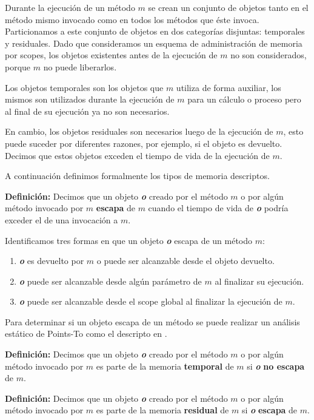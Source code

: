 \documentclass[12pt,a4paper]{article}
\begin{document}
			Durante la ejecución de un método $m$ se crean un conjunto de objetos tanto en el método mismo invocado como en todos los métodos que éste invoca. Particionamos a este conjunto de objetos en dos categorías disjuntas: temporales y residuales. Dado que consideramos un esquema de administración de memoria por scopes, los objetos existentes antes de la ejecución de $m$ no son considerados, porque $m$ no puede liberarlos.

			Los objetos temporales son los objetos que $m$ utiliza de forma auxiliar, los mismos son utilizados durante la ejecución de $m$ para un cálculo o proceso pero al final de su ejecución ya no son necesarios.

			En cambio, los objetos residuales son necesarios luego de la ejecución de $m$, esto puede suceder por diferentes razones, por ejemplo, si el objeto es devuelto. Decimos que estos objetos exceden el tiempo de vida de la ejecución de $m$.

			A continuación definimos formalmente los tipos de memoria descriptos.

			\textbf{Definición:} Decimos que un objeto \textit{\textbf{o}} creado por el método $m$ o por algún método invocado por $m$ \textbf{escapa} de $m$ cuando el tiempo de vida de \textit{\textbf{o}} podría exceder el de una invocación a $m$.

			Identificamos tres formas en que un objeto \textit{\textbf{o}} escapa de un método $m$:
			\begin{enumerate}
				\item \textit{\textbf{o}} es devuelto por $m$ o puede ser alcanzable desde el objeto devuelto.
				\item \textit{\textbf{o}} puede ser alcanzable desde algún parámetro de $m$ al finalizar su ejecución.
				\item \textit{\textbf{o}} puede ser alcanzable desde el scope global al finalizar la ejecución de $m$.
			\end{enumerate}

			Para determinar si un objeto escapa de un método se puede realizar un análisis estático de Points-To como el descripto en \cite{BFGL07}.

			\textbf{Definición:} Decimos que un objeto \textit{\textbf{o}} creado por el método $m$ o por algún método invocado por $m$ es parte de la memoria \textbf{temporal} de $m$ si \textit{\textbf{o}} \textbf{no escapa} de $m$.

			\textbf{Definición:} Decimos que un objeto \textit{\textbf{o}} creado por el método $m$ o por algún método invocado por $m$ es parte de la memoria \textbf{residual} de $m$ si \textit{\textbf{o}} \textbf{escapa} de $m$.
\end{document}
